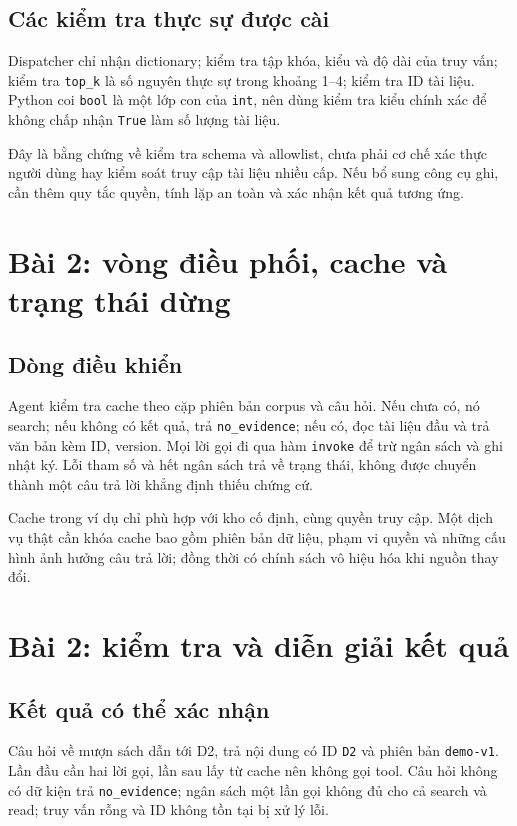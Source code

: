 \subsection{Các kiểm tra thực sự được cài}
Dispatcher chỉ nhận dictionary; kiểm tra tập khóa, kiểu và độ dài của truy vấn;
kiểm tra \texttt{top\_k} là số nguyên thực sự trong khoảng 1--4; kiểm tra ID tài liệu.
Python coi \texttt{bool} là một lớp con của \texttt{int}, nên dùng kiểm tra kiểu
chính xác để không chấp nhận \texttt{True} làm số lượng tài liệu.

Đây là bằng chứng về kiểm tra schema và allowlist, chưa phải cơ chế xác thực người
dùng hay kiểm soát truy cập tài liệu nhiều cấp. Nếu bổ sung công cụ ghi, cần thêm
quy tắc quyền, tính lặp an toàn và xác nhận kết quả tương ứng.

\newpage
\section*{Bài 2: vòng điều phối, cache và trạng thái dừng}

\subsection{Dòng điều khiển}
Agent kiểm tra cache theo cặp phiên bản corpus và câu hỏi. Nếu chưa có, nó search;
nếu không có kết quả, trả \texttt{no\_evidence}; nếu có, đọc tài liệu đầu và trả
văn bản kèm ID, version. Mọi lời gọi đi qua hàm \texttt{invoke} để trừ ngân sách và
ghi nhật ký. Lỗi tham số và hết ngân sách trả về trạng thái, không được chuyển thành
một câu trả lời khẳng định thiếu chứng cứ.

Cache trong ví dụ chỉ phù hợp với kho cố định, cùng quyền truy cập. Một dịch vụ thật
cần khóa cache bao gồm phiên bản dữ liệu, phạm vi quyền và những cấu hình ảnh hưởng
câu trả lời; đồng thời có chính sách vô hiệu hóa khi nguồn thay đổi.

\newpage
\section*{Bài 2: kiểm tra và diễn giải kết quả}

\subsection{Kết quả có thể xác nhận}
Câu hỏi về mượn sách dẫn tới D2, trả nội dung có ID \texttt{D2} và phiên bản
\texttt{demo-v1}. Lần đầu cần hai lời gọi, lần sau lấy từ cache nên không gọi tool.
Câu hỏi không có dữ kiện trả \texttt{no\_evidence}; ngân sách một lần gọi không đủ
cho cả search và read; truy vấn rỗng và ID không tồn tại bị xử lý lỗi.

